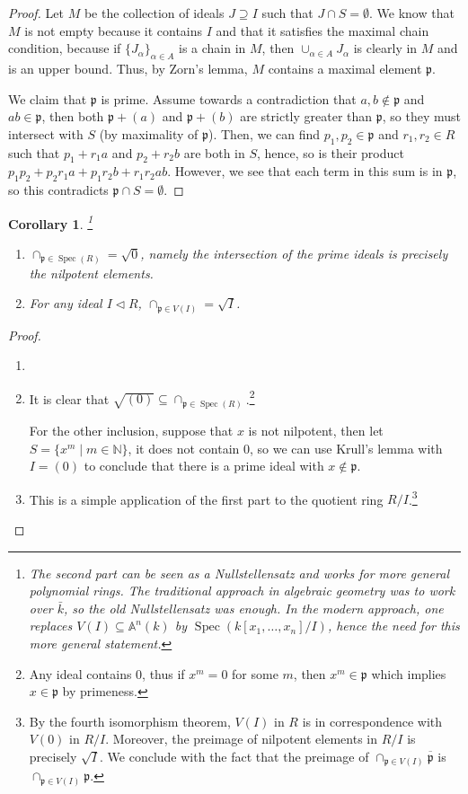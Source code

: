 \documentclass{tufte-handout} %
\newtheorem{cor}[thm]{Corollary}
\theoremstyle{definition}
\theoremstyle{remark}
\newcommand{\N}{\mathbb{N}}
\newcommand{\bA}{\mathbb{A}}
\newcommand{\lp}{{\mathfrak{p}}}
\DeclareMathOperator{\spec}{Spec}
\begin{document}
\begin{proof}
	Let $M$ be the collection of ideals $J \supseteq I$ such that $J \cap S = \emptyset$. We know that $M$ is not empty because it contains $I$ and that it satisfies the maximal chain condition, because if $\{J_{\alpha}\}_{\alpha \in A}$ is a chain in $M$, then $\cup_{\alpha\in A} J_{\alpha}$ is clearly in $M$ and is an upper bound. Thus, by Zorn's lemma, $M$ contains a maximal element $\lp$. 
	
	We claim that $\lp$ is prime. Assume towards a contradiction that $a, b \notin \lp$ and $ab \in \lp$, then both $\lp + (a)$ and $\lp +(b)$ are strictly greater than $\lp$, so they must intersect with $S$ (by maximality of $\lp$). Then, we can find $p_1, p_2 \in \lp$ and $r_1, r_2 \in R$ such that $p_1 + r_1a$ and $p_2+r_2b$ are both in $S$, hence, so is their product $p_1p_2+p_2r_1a + p_1r_2b + r_1r_2ab$. However, we see that each term in this sum is in $\lp$, so this contradicts $\lp\cap S = \emptyset$.
\end{proof}
\begin{cor}\label{nilprimes}\footnote{The second part can be seen as a Nullstellensatz and works for more general polynomial rings. The traditional approach in algebraic geometry was to work over $\bar{k}$, so the old Nullstellensatz was enough. In the modern approach, one replaces $V(I) \subseteq \bA^n(k)$ by $\spec(k[x_1, \dots, x_n]/I)$, hence the need for this more general statement.}
	\begin{enumerate}
		\item $\cap_{\lp \in \spec(R)} = \sqrt{0}$, namely the intersection of the prime ideals is precisely the nilpotent elements.
		\item For any ideal $I \lhd R$, $\cap_{\lp \in V(I)}= \sqrt{I}$.
	\end{enumerate}
\end{cor}
\begin{proof}
	\begin{enumerate}
		\item[]
		\item It is clear that $\sqrt{(0)} \subseteq \cap_{\lp \in \spec(R)}$.\footnote{Any ideal contains $0$, thus if $x^m = 0$ for some $m$, then $x^m \in \lp$ which implies $x \in \lp$ by primeness.}
		
		For the other inclusion, suppose that $x$ is not nilpotent, then let $S = \{x^m \mid m \in \N\}$, it does not contain $0$, so we can use Krull's lemma with $I = (0)$ to conclude that there is a prime ideal with $x \notin \lp$.
		\item This is a simple application of the first part to the quotient ring $R/I$.\footnote{By the fourth isomorphism theorem, $V(I)$ in $R$ is in correspondence with $V(0)$ in $R/I$. Moreover, the preimage of nilpotent elements in $R/I$ is precisely $\sqrt{I}$. We conclude with the fact that the preimage of $\cap_{\lp \in V(I)} \overline{\lp}$ is $\cap_{\lp \in V(I)} \lp$.}
	\end{enumerate}
\end{proof}
\end{document}
